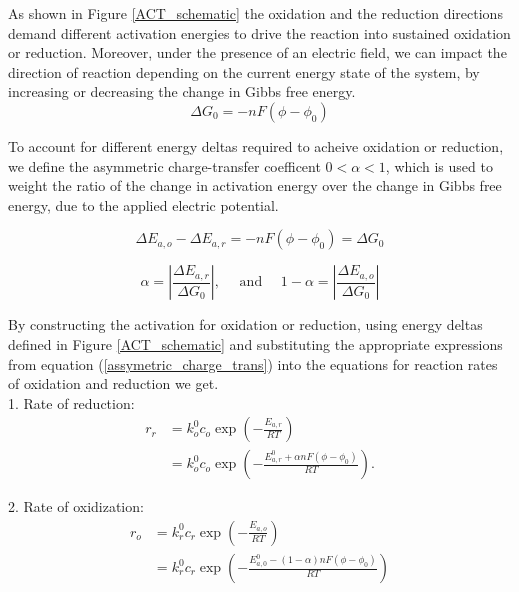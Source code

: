 \documentclass[lettersize,journal]{IEEEtran}
\begin{document}
As shown in Figure \ref{ACT_schematic} the oxidation and the reduction directions demand different activation energies to drive the reaction into sustained oxidation or reduction. Moreover, under the presence of an electric field, we can impact the direction of reaction depending on the current energy state of the system, by increasing or decreasing the change in Gibbs free energy.
\begin{equation}
\Delta G_{0}=-n F\left(\phi-\phi_{0}\right)
\end{equation}

\noindent To account for different energy deltas required to acheive oxidation or reduction, we define the asymmetric charge-transfer coefficent $0 < \alpha < 1$, which is used to weight the ratio of the change in activation energy over the change in Gibbs free energy, due to the applied electric potential.

\begin{equation}
\Delta E_{a, o}-\Delta E_{a, r}=-n F\left(\phi-\phi_{0}\right)=\Delta G_{0}
\end{equation}

\begin{equation}\label{assymetric_charge_trans}
\alpha=\left|\frac{\Delta E_{a, r}}{\Delta G_{0}}\right|, \quad \text { and } \quad 1-\alpha=\left|\frac{\Delta E_{a, o}}{\Delta G_{0}}\right|
\end{equation}


\noindent By constructing the activation for oxidation or reduction, using energy deltas defined in Figure \ref{ACT_schematic} and substituting the appropriate expressions from equation (\ref{assymetric_charge_trans}) into the equations for reaction rates of oxidation and reduction we get. \\

1. Rate of reduction:
\begin{equation}
  \begin{aligned}
  r_{r} &=k_{o}^{0} c_{o} \exp \left(-\frac{E_{a, r}}{R T}\right) \\
  &=k_{o}^{0} c_{o} \exp \left(-\frac{E_{a, r}^{0}+\alpha n F\left(\phi-\phi_{0}\right)}{R T}\right) .
  \end{aligned}
\end{equation}

2. Rate of oxidization:
\begin{equation}
  \begin{aligned}
  r_{o} &=k_{r}^{0} c_{r} \exp \left(-\frac{E_{a, o}}{R T}\right) \\
  &=k_{r}^{0} c_{r} \exp \left(-\frac{E_{a, 0}^{0}-(1-\alpha) n F\left(\phi-\phi_{0}\right)}{R T}\right)
  \end{aligned}
\end{equation}
\end{document}
